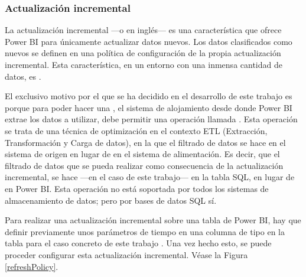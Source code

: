 \subsubsection{Actualización incremental}
La actualización incremental ---o  en inglés--- es una característica que ofrece Power BI para únicamente actualizar datos nuevos. Los datos clasificados como nuevos se definen en una política de configuración de la propia actualización incremental. Esta  característica, en un entorno  con una inmensa cantidad de datos, es . 

El exclusivo motivo por el que se ha decidido  en el desarrollo de este trabajo es porque para poder hacer una , el sistema de alojamiento desde donde Power BI extrae los datos a utilizar, debe permitir una operación llamada . Esta operación se trata de una técnica de optimización en el contexto ETL (Extracción, Transformación y Carga de datos), en la que el filtrado de datos se hace en el sistema de origen en lugar de en el sistema de alimentación. Es decir, que el filtrado de datos que se pueda realizar como consecuencia de la actualización incremental, se hace ---en el caso de este trabajo--- en la tabla SQL, en lugar de en Power BI. Esta operación no está soportada por todos los sistemas de almacenamiento de datos; pero por bases de datos SQL sí.

Para realizar una actualización incremental sobre una tabla de Power BI, hay que definir previamente unos parámetros de tiempo en una columna de tipo  en la tabla  para el caso concreto de este trabajo \parencite{incrRefr}. Una vez hecho esto, se puede proceder configurar esta actualización incremental. Véase la Figura \ref{refreshPolicy}.

